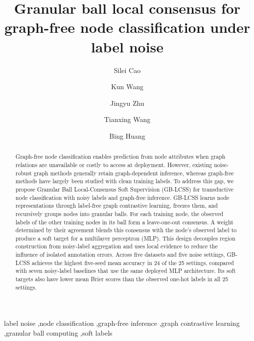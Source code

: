 \documentclass[times,review,10pt]{elsarticle}
\theoremstyle{definition}
\theoremstyle{plain}
\begin{document}
\begin{frontmatter}

\title{Granular ball local consensus for graph-free node classification under label noise}

\author[inst1]{{\footnotesize Silei Cao}}
\author[inst1]{{\footnotesize Kun Wang}}
\author[inst2]{{\footnotesize Jingyu Zhu}}
\author[inst3]{{\footnotesize Tianxing Wang}}
\author[inst1]{{\footnotesize Bing Huang}}


\begin{abstract}
\renewcommand{\baselinestretch}{1.5}\selectfont
Graph-free node classification enables prediction from node attributes when graph relations are unavailable or costly to access at deployment. However, existing noise-robust graph methods generally retain graph-dependent inference, whereas graph-free methods have largely been studied with clean training labels. To address this gap, we propose Granular Ball Local-Consensus Soft Supervision (GB-LCSS) for transductive node classification with noisy labels and graph-free inference. GB-LCSS learns node representations through label-free graph contrastive learning, freezes them, and recursively groups nodes into granular balls. For each training node, the observed labels of the other training nodes in its ball form a leave-one-out consensus. A weight determined by their agreement blends this consensus with the node's observed label to produce a soft target for a multilayer perceptron (MLP). This design decouples region construction from noisy-label aggregation and uses local evidence to reduce the influence of isolated annotation errors. Across five datasets and five noise settings, GB-LCSS achieves the highest five-seed mean accuracy in 24 of the 25 settings, compared with seven noisy-label baselines that use the same deployed MLP architecture. Its soft targets also have lower mean Brier scores than the observed one-hot labels in all 25 settings.
\end{abstract}

\begin{keyword}
label noise \sep node classification \sep graph-free inference \sep graph contrastive learning \sep granular ball computing \sep soft labels
\end{keyword}

\end{frontmatter}
\end{document}
